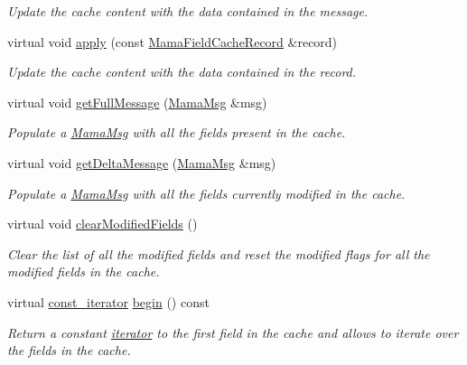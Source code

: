 \begin{DoxyCompactItemize}
\begin{DoxyCompactList}\small\item\em Update the cache content with the data contained in the message. \item\end{DoxyCompactList}\item 
virtual void \hyperlink{classWombat_1_1MamaFieldCache_ae90c2df69a7629f36b5a6b142987d1aa}{apply} (const \hyperlink{classWombat_1_1MamaFieldCacheRecord}{MamaFieldCacheRecord} \&record)
\begin{DoxyCompactList}\small\item\em Update the cache content with the data contained in the record. \item\end{DoxyCompactList}\item 
virtual void \hyperlink{classWombat_1_1MamaFieldCache_a4a68b6218d7c68b514c15199d05c0abc}{getFullMessage} (\hyperlink{classWombat_1_1MamaMsg}{MamaMsg} \&msg)
\begin{DoxyCompactList}\small\item\em Populate a \hyperlink{classWombat_1_1MamaMsg}{MamaMsg} with all the fields present in the cache. \item\end{DoxyCompactList}\item 
virtual void \hyperlink{classWombat_1_1MamaFieldCache_a723a5a3df4a735cccb815c8741036cb6}{getDeltaMessage} (\hyperlink{classWombat_1_1MamaMsg}{MamaMsg} \&msg)
\begin{DoxyCompactList}\small\item\em Populate a \hyperlink{classWombat_1_1MamaMsg}{MamaMsg} with all the fields currently modified in the cache. \item\end{DoxyCompactList}\item 
virtual void \hyperlink{classWombat_1_1MamaFieldCache_a0e1b3f9a665da4328b799e8202c2764b}{clearModifiedFields} ()
\begin{DoxyCompactList}\small\item\em Clear the list of all the modified fields and reset the modified flags for all the modified fields in the cache. \item\end{DoxyCompactList}\item 
virtual \hyperlink{classWombat_1_1MamaFieldCache_1_1const__iterator}{const\_\-iterator} \hyperlink{classWombat_1_1MamaFieldCache_a55396aaa405bddacc892dc71a2b3a09b}{begin} () const 
\begin{DoxyCompactList}\small\item\em Return a constant \hyperlink{classWombat_1_1MamaFieldCache_1_1iterator}{iterator} to the first field in the cache and allows to iterate over the fields in the cache. \item\end{DoxyCompactList}\item 

\end{DoxyCompactItemize}
